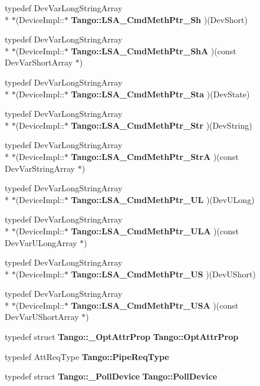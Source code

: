 \begin{DoxyCompactItemize}
\item 
typedef Dev\-Var\-Long\-String\-Array \\*
$\ast$(Device\-Impl\-::$\ast$ {\bf Tango\-::\-L\-S\-A\-\_\-\-Cmd\-Meth\-Ptr\-\_\-\-Sh} )(Dev\-Short)
\item 
typedef Dev\-Var\-Long\-String\-Array \\*
$\ast$(Device\-Impl\-::$\ast$ {\bf Tango\-::\-L\-S\-A\-\_\-\-Cmd\-Meth\-Ptr\-\_\-\-Sh\-A} )(const Dev\-Var\-Short\-Array $\ast$)
\item 
typedef Dev\-Var\-Long\-String\-Array \\*
$\ast$(Device\-Impl\-::$\ast$ {\bf Tango\-::\-L\-S\-A\-\_\-\-Cmd\-Meth\-Ptr\-\_\-\-Sta} )(Dev\-State)
\item 
typedef Dev\-Var\-Long\-String\-Array \\*
$\ast$(Device\-Impl\-::$\ast$ {\bf Tango\-::\-L\-S\-A\-\_\-\-Cmd\-Meth\-Ptr\-\_\-\-Str} )(Dev\-String)
\item 
typedef Dev\-Var\-Long\-String\-Array \\*
$\ast$(Device\-Impl\-::$\ast$ {\bf Tango\-::\-L\-S\-A\-\_\-\-Cmd\-Meth\-Ptr\-\_\-\-Str\-A} )(const Dev\-Var\-String\-Array $\ast$)
\item 
typedef Dev\-Var\-Long\-String\-Array \\*
$\ast$(Device\-Impl\-::$\ast$ {\bf Tango\-::\-L\-S\-A\-\_\-\-Cmd\-Meth\-Ptr\-\_\-\-U\-L} )(Dev\-U\-Long)
\item 
typedef Dev\-Var\-Long\-String\-Array \\*
$\ast$(Device\-Impl\-::$\ast$ {\bf Tango\-::\-L\-S\-A\-\_\-\-Cmd\-Meth\-Ptr\-\_\-\-U\-L\-A} )(const Dev\-Var\-U\-Long\-Array $\ast$)
\item 
typedef Dev\-Var\-Long\-String\-Array \\*
$\ast$(Device\-Impl\-::$\ast$ {\bf Tango\-::\-L\-S\-A\-\_\-\-Cmd\-Meth\-Ptr\-\_\-\-U\-S} )(Dev\-U\-Short)
\item 
typedef Dev\-Var\-Long\-String\-Array \\*
$\ast$(Device\-Impl\-::$\ast$ {\bf Tango\-::\-L\-S\-A\-\_\-\-Cmd\-Meth\-Ptr\-\_\-\-U\-S\-A} )(const Dev\-Var\-U\-Short\-Array $\ast$)
\item 
typedef struct {\bf Tango\-::\-\_\-\-Opt\-Attr\-Prop} {\bf Tango\-::\-Opt\-Attr\-Prop}
\item 
typedef Att\-Req\-Type {\bf Tango\-::\-Pipe\-Req\-Type}
\item 
typedef struct {\bf Tango\-::\-\_\-\-Poll\-Device} {\bf Tango\-::\-Poll\-Device}
\item 

\end{DoxyCompactItemize}
